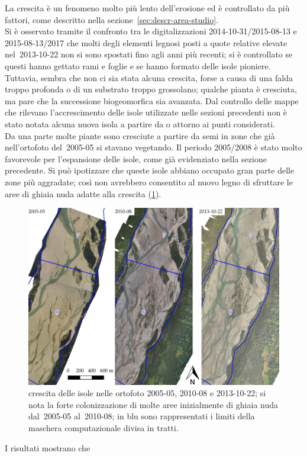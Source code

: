 La crescita è un fenomeno molto più lento dell'erosione ed è controllato da più fattori, come descritto nella sezione~\ref{sec:descr-area-studio}.
\\
Si è osservato tramite il confronto tra le digitalizzazioni 2014-10-31/2015-08-13 e 2015-08-13/2017 che molti degli elementi legnosi posti a quote relative elevate nel~2013-10-22 non si sono spostati fino agli anni più recenti; si è controllato se questi hanno gettato rami e foglie e se hanno formato delle isole pioniere.
Tuttavia, sembra che non ci sia stata alcuna crescita, forse a causa di una falda troppo profonda o di un substrato troppo grossolano; qualche pianta è cresciuta, ma pare che la successione biogeomorfica sia avanzata.
Dal controllo delle mappe che rilevano l'accrescimento delle isole utilizzate nelle sezioni precedenti non è stato notata alcuna nuova isola a partire da o attorno ai punti considerati.
\\
Da una parte molte piante sono cresciute a partire da semi in zone che già nell'ortofoto del~2005-05 si stavano vegetando. Il periodo 2005/2008 è stato molto favorevole per l'espansione delle isole, come già evidenziato nella sezione precedente.
Si può ipotizzare che queste isole abbiano occupato gran parte delle zone più aggradate; così non avrebbero consentito al nuovo legno di sfruttare le aree di ghiaia nuda adatte alla crescita (\cref{fig:crescita-2005-2010-2013}).
%
\begin{figure}
	\centering
	\includegraphics[width = \textwidth]{files/crescita_2005_2010_2013.jpeg}
	\caption[crescita delle isole nelle ortofoto 2005-05, 2010-08 e 2013-10-22]{crescita delle isole nelle ortofoto 2005-05, 2010-08 e 2013-10-22; si nota la forte colonizzazione di molte aree inizialmente di ghiaia nuda dal~2005-05 al~2010-08; in blu sono rappresentati i limiti della maschera computazionale divisa in tratti.}
	\label{fig:crescita-2005-2010-2013}
\end{figure}
%

I risultati mostrano che 
